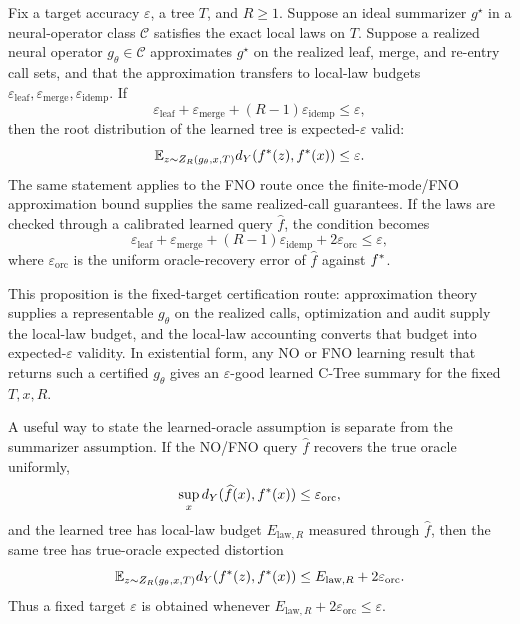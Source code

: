 \begin{proposition}
\label{prop:fixed-epsilon-no-recovery}
Fix a target accuracy \(\varepsilon\), a tree \(T\), and \(R\ge1\).
Suppose an ideal summarizer \(g^\star\) in a neural-operator class
\(\mathcal C\) satisfies the exact local laws on \(T\). Suppose a
realized neural operator \(g_\theta\in\mathcal C\) approximates
\(g^\star\) on the realized leaf, merge, and re-entry call sets, and
that the approximation transfers to local-law budgets
\(\varepsilon_{\mathrm{leaf}},\varepsilon_{\mathrm{merge}},
\varepsilon_{\mathrm{idemp}}\). If
\[
  \varepsilon_{\mathrm{leaf}}
  +\varepsilon_{\mathrm{merge}}
  +(R-1)\varepsilon_{\mathrm{idemp}}
  \le \varepsilon ,
\]
then the root distribution of the learned tree is expected-\(\varepsilon\)
valid:
\[
  \mathbb E_{z\sim Z_R(g_\theta,x,T)}
  d_Y(f^\ast(z),f^\ast(x))
  \le \varepsilon .
\]
The same statement applies to the FNO route once the finite-mode/FNO
approximation bound supplies the same realized-call guarantees. If the
laws are checked through a calibrated learned query \(\widehat f\), the
condition becomes
\[
  \varepsilon_{\mathrm{leaf}}
  +\varepsilon_{\mathrm{merge}}
  +(R-1)\varepsilon_{\mathrm{idemp}}
  +2\varepsilon_{\mathrm{orc}}
  \le \varepsilon ,
\]
where \(\varepsilon_{\mathrm{orc}}\) is the uniform oracle-recovery error of
\(\widehat f\) against \(f^\ast\).
\end{proposition}

This proposition is the fixed-target certification route:
approximation theory supplies a representable \(g_\theta\) on the
realized calls, optimization and audit supply the local-law budget, and
the local-law accounting converts that budget into
expected-\(\varepsilon\) validity.
In existential form, any NO or FNO learning result that returns such a
certified \(g_\theta\) gives an \(\varepsilon\)-good learned C-Tree
summary for the fixed \(T,x,R\).

A useful way to state the learned-oracle assumption is separate from the
summarizer assumption. If the NO/FNO query \(\widehat f\) recovers the
true oracle uniformly,
\[
  \sup_x d_Y(\widehat f(x),f^\ast(x)) \le \varepsilon_{\mathrm{orc}},
\]
and the learned tree has local-law budget \(E_{\mathrm{law},R}\) measured
through \(\widehat f\), then the same tree has true-oracle expected
distortion
\[
  \mathbb E_{z\sim Z_R(g_\theta,x,T)}
  d_Y(f^\ast(z),f^\ast(x))
  \le E_{\mathrm{law},R}+2\varepsilon_{\mathrm{orc}}.
\]
Thus a fixed target \(\varepsilon\) is obtained whenever
\(E_{\mathrm{law},R}+2\varepsilon_{\mathrm{orc}}\le\varepsilon\).

